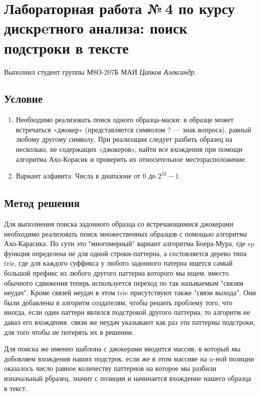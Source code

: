 \documentclass[12pt]{article}
\begin{document}
\section*{Лабораторная работа №\,4 по курсу дискрeтного анализа: поиск подстроки в тексте}

Выполнил студент группы М8О-207Б МАИ \textit{Цапков Александр}.

\subsection*{Условие}

\begin{enumerate}
\item Необходимо реализовать поиск одного образца-маски: в образце может встречаться «джокер» (представляется символом ? — знак вопроса), равный любому другому символу. При реализации следует разбить образец на несколько, не содержащих «джокеров», найти все вхождения при помощи алгоритма Ахо-Корасик и проверить их относительное месторасположение.
\item Вариант алфавита: Числа в диапазоне от $0$ до  $2^32 - 1$.
\end{enumerate}

\subsection*{Метод решения}

Для выполнения поиска задонного образца со встречающимися джокерами необходимо реализовать поиск множественных образцов с помощью алгоритма Ахо-Карасика. По сути это "многомерный" вариант алгоритма Боера-Мура, где sp функция определена не для одной строки-паттерна, а состовляется дерево типа trie, где для каждого суффикса у любого задонного патерна ищется самый большой префикс из любого другого паттерна которого мы ищем. вместо обычного сдвижения теперь используется переход по так называемым "связям неудач". Кроме связей неудач в этом trie присутствуют также "связи выхода". Они были добавлены в алгоритм создателям, чтобы решить проблему того, что иногда, если один паттерн являлся подстрокой другого паттерна, то алгоритм не давал его вхождения. связи же неудач указывают как раз эти паттерны подстроки, для того чтобы не потерять их в решении. 

Для поиска же именно шаблона с джокерами вводится массив, в который мы добовляем вхождения наших подстрок. если же в этом массиве на n-ной позиции оказалось число равное количеству паттернов на которое мы разбили изначальный рбразец, значит с позиции и начинается вхождение нашего образца в текст.
\end{document}
